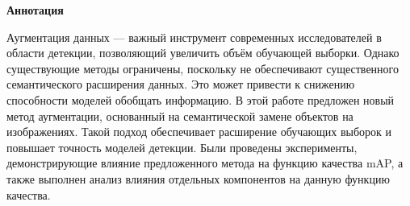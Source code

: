 \begin{center}
    \Large{\textbf{Аннотация}}
\end{center}
Аугментация данных — важный инструмент современных исследователей в области детекции, позволяющий увеличить объём обучающей выборки. Однако существующие методы ограничены, поскольку не обеспечивают существенного семантического расширения данных. Это может привести к снижению способности моделей обобщать информацию. В этой работе предложен новый метод аугментации, основанный на семантической замене объектов на изображениях. Такой подход обеспечивает расширение обучающих выборок и повышает точность моделей детекции. Были проведены эксперименты, демонстрирующие влияние предложенного метода на функцию качества mAP, а также выполнен анализ влияния отдельных компонентов на данную функцию качества.